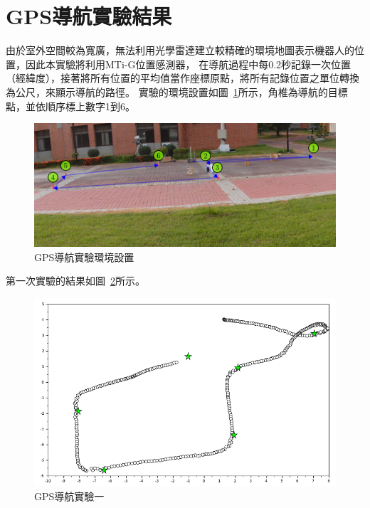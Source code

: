 \section{GPS導航實驗結果}
由於室外空間較為寬廣，無法利用光學雷達建立較精確的環境地圖表示機器人的位置，因此本實驗將利用MTi-G位置感測器，
在導航過程中每0.2秒記錄一次位置（經緯度），接著將所有位置的平均值當作座標原點，將所有記錄位置之單位轉換為公尺，來顯示導航的路徑。
實驗的環境設置如圖~\ref{f:exp:nav_env}所示，角椎為導航的目標點，並依順序標上數字1到6。
\begin{figure}
	\centering
	\includegraphics[width=\textwidth]{figures/experiments/nav_env}
	\caption{GPS導航實驗環境設置}
	\label{f:exp:nav_env}
\end{figure}

第一次實驗的結果如圖~\ref{f:exp:nav_1}所示。
\begin{figure}[h!]
	\centering
	\includegraphics[width=\textwidth]{figures/experiments/path_nav_1}
	\caption{GPS導航實驗一}
	\label{f:exp:nav_1}
\end{figure}

